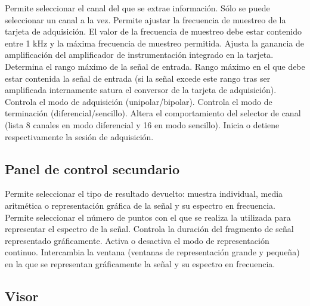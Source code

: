 \begin{enumerate}
     Permite seleccionar el canal del que se
	extrae información. Sólo se puede seleccionar un canal a la vez.
     Permite ajustar la frecuencia de
	muestreo de la tarjeta de adquisición. El valor de la frecuencia de
	muestreo debe estar contenido entre 1 kHz y la máxima frecuencia de
	muestreo permitida.
     Ajusta la ganancia de amplificación del
	amplificador de instrumentación integrado en la tarjeta. Determina
	el rango máximo de la señal de entrada.
     Rango máximo en el que debe estar contenida
	la señal de entrada (si la señal excede este rango tras ser
	amplificada internamente satura el conversor  de la
	tarjeta de adquisición).
     Controla el modo de adquisición
	(unipolar/bipolar).
     Controla el modo de terminación
	(diferencial/sencillo). Altera el comportamiento del selector de
	canal (lista 8 canales en modo diferencial y 16 en modo sencillo).
     Inicia o detiene respectivamente la sesión
	de adquisición.
\end{enumerate}


\subsection{Panel de control secundario}

\begin{enumerate}
     Permite seleccionar el tipo de
	resultado devuelto: muestra individual, media aritmética o
	representación gráfica de la señal y su espectro en frecuencia.
     Permite seleccionar el número de puntos con
	el que se realiza la  utilizada para representar el
	espectro de la señal.
     Controla la duración del fragmento de señal
	representado gráficamente. Activa o desactiva el modo de
	representación continuo.
     Intercambia la ventana (ventanas de
	representación grande y pequeña) en la que se representan
	gráficamente la señal y su espectro en frecuencia.
\end{enumerate}


\subsection{Visor}

